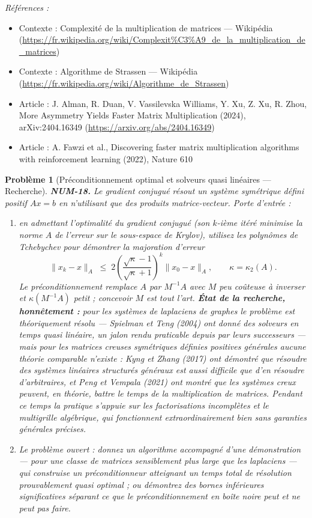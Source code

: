 \documentclass[11pt]{article}
\newtheorem{problem}{Problème}
\newenvironment{refs}{\par\small\noindent\emph{Références :}\begin{itemize}\setlength\itemsep{0pt}}{\end{itemize}\normalsize}
\begin{document}
\begin{refs}
\item Contexte : Complexité de la multiplication de matrices --- Wikipédia (\url{https://fr.wikipedia.org/wiki/Complexit%C3%A9_de_la_multiplication_de_matrices})
\item Contexte : Algorithme de Strassen --- Wikipédia (\url{https://fr.wikipedia.org/wiki/Algorithme_de_Strassen})
\item Article : J. Alman, R. Duan, V. Vassilevska Williams, Y. Xu, Z. Xu, R. Zhou, \og{} More Asymmetry Yields Faster Matrix Multiplication \fg{} (2024), arXiv:2404.16349 (\url{https://arxiv.org/abs/2404.16349})
\item Article : A. Fawzi et al., \og{} Discovering faster matrix multiplication algorithms with reinforcement learning \fg{} (2022), Nature 610
\end{refs}

\bigskip

\begin{problem}[{Préconditionnement optimal et solveurs quasi linéaires --- Recherche}]
\textbf{NUM-18.} Le gradient conjugué résout un système
symétrique défini positif $Ax = b$ en n'utilisant que des produits matrice-vecteur.
Porte d'entrée :
\begin{enumerate}
\item[(a)] en admettant l'optimalité du gradient conjugué (son $k$-ième itéré minimise la
norme $A$ de l'erreur sur le sous-espace de Krylov), utilisez les polynômes de
Tchebychev pour démontrer la majoration d'erreur
\[ \|x_k - x\|_A \;\le\; 2\left( \frac{\sqrt{\kappa} - 1}{\sqrt{\kappa} + 1} \right)^{k} \|x_0 - x\|_A,
\qquad \kappa = \kappa_2(A). \]
Le préconditionnement remplace $A$ par $M^{-1}A$ avec $M$ peu coûteuse à inverser
et $\kappa(M^{-1}A)$ petit ; concevoir $M$ est tout l'art. \textbf{État de la recherche,
honnêtement :} pour les systèmes de laplaciens de graphes le problème est
théoriquement résolu --- Spielman et Teng (2004) ont donné des solveurs en temps quasi
linéaire, un jalon rendu praticable depuis par leurs successeurs --- mais pour les
matrices creuses symétriques définies positives générales aucune théorie comparable
n'existe : Kyng et Zhang (2017) ont démontré que résoudre des systèmes linéaires
structurés généraux est aussi difficile que d'en résoudre d'arbitraires, et Peng et
Vempala (2021) ont montré que les systèmes creux peuvent, en théorie, battre le temps de
la multiplication de matrices. Pendant ce temps la pratique s'appuie sur les
factorisations incomplètes et le multigrille algébrique, qui fonctionnent
extraordinairement bien sans garanties générales précises.
\item[(b)] Le problème ouvert : donnez un
algorithme accompagné d'une démonstration --- pour une classe de matrices sensiblement
plus large que les laplaciens --- qui construise un préconditionneur atteignant un temps
total de résolution prouvablement quasi optimal ; ou démontrez des bornes inférieures
significatives séparant ce que le préconditionnement en boîte noire peut et ne peut
pas faire.
\end{enumerate}

\end{problem}
\end{document}
